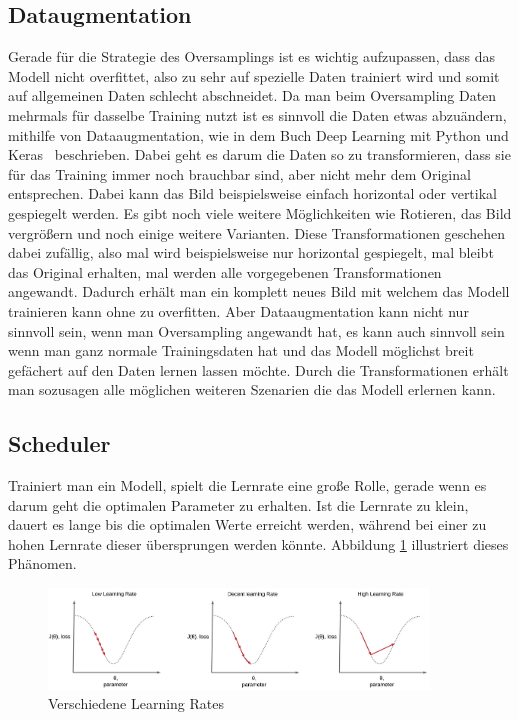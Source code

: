 \documentclass[12pt, a4paper]{article}
\begin{document}
\subsection{Dataugmentation}
Gerade für die Strategie des Oversamplings ist es wichtig aufzupassen, dass das Modell nicht overfittet, also zu sehr auf spezielle Daten trainiert wird und somit auf allgemeinen Daten schlecht abschneidet. Da man beim Oversampling Daten mehrmals für dasselbe Training nutzt ist es sinnvoll die Daten etwas abzuändern, mithilfe von Dataaugmentation, wie in dem Buch \glqq Deep Learning mit Python und Keras\grqq{}~\cite{b6} beschrieben. Dabei geht es darum die Daten so zu transformieren, dass sie für das Training immer noch brauchbar sind, aber nicht mehr dem Original entsprechen. Dabei kann das Bild beispielsweise einfach horizontal oder vertikal gespiegelt werden. Es gibt noch viele weitere Möglichkeiten wie Rotieren, das Bild vergrößern und noch einige weitere Varianten. Diese Transformationen geschehen dabei zufällig, also mal wird beispielsweise nur horizontal gespiegelt, mal bleibt das Original erhalten, mal werden alle vorgegebenen Transformationen angewandt. Dadurch erhält man ein komplett neues Bild mit welchem das Modell trainieren kann ohne zu overfitten. Aber Dataaugmentation kann nicht nur sinnvoll sein, wenn man Oversampling angewandt hat, es kann auch sinnvoll sein wenn man ganz normale Trainingsdaten hat und das Modell möglichst breit gefächert auf den Daten lernen lassen möchte. Durch die Transformationen erhält man sozusagen alle möglichen weiteren Szenarien die das Modell erlernen kann.

\subsection{Scheduler}
Trainiert man ein Modell, spielt die Lernrate eine große Rolle, gerade wenn es darum geht die optimalen Parameter zu erhalten. Ist die Lernrate zu klein, dauert es lange bis die optimalen Werte erreicht werden, während bei einer zu hohen Lernrate dieser übersprungen werden könnte. Abbildung \ref{fig:lr} illustriert dieses Phänomen.

\begin{figure}[t]
\centering
\includegraphics[width=0.9\textwidth]{lernrates-vs.png}
\caption{Verschiedene Learning Rates}
\label{fig:lr}
\end{figure}
\end{document}
